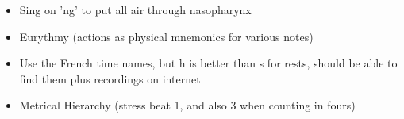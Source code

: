 \documentclass[14pt,a4paper]{memoir}
\begin{document}
\begin{itemize}
\item Sing on 'ng' to put all air through nasopharynx

\item Eurythmy (actions as physical mnemonics for various notes)

\item Use the French time names, but h is better than s for rests, should be able to find them plus recordings on internet

\item Metrical Hierarchy (stress beat 1, and also 3 when counting in fours)

\end{itemize}
\end{document}
